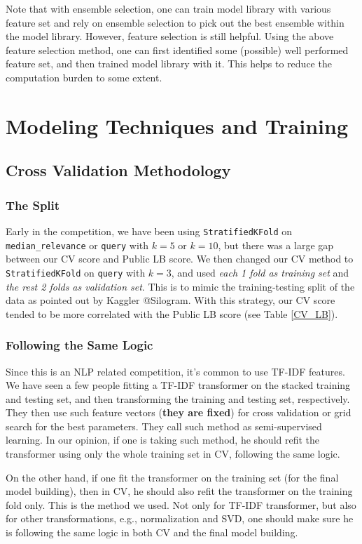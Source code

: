 \documentclass[12pt]{article}
\begin{document}
Note that with ensemble selection, one can train model library with various feature set and rely on ensemble selection to pick out the best ensemble within the model library. However, feature selection is still helpful. Using the above feature selection method, one can first identified some (possible) well performed feature set, and then trained model library with it. This helps to reduce the computation burden to some extent.

\section{Modeling Techniques and Training}
\subsection{Cross Validation Methodology}
\subsubsection{The Split}
Early in the competition, we have been using \texttt{StratifiedKFold} on \texttt{median\_relevance} or \texttt{query} with $k = 5$ or $k = 10$, but there was a large gap between our CV score and Public LB score. We then changed our CV method to \texttt{StratifiedKFold} on \texttt{query} with $k = 3$, and used \emph{each 1 fold as training set} and \emph{the rest 2 folds as validation set}. This is to mimic the training-testing split of the data as pointed out by Kaggler @Silogram. With this strategy, our CV score tended to be more correlated with the Public LB score (see Table \ref{CV_LB}).
\subsubsection{Following the Same Logic}
Since this is an NLP related competition, it's common to use TF-IDF features. We have seen a few people fitting a TF-IDF transformer on the stacked training and testing set, and then transforming the training and testing set, respectively. They then use such feature vectors (\textbf{they are fixed}) for cross validation or grid search for the best parameters. They call such method as semi-supervised learning. In our opinion, if one is taking such method, he should refit the transformer using only the whole training set in CV, following the same logic.

On the other hand, if one fit the transformer on the training set (for the final model building), then in CV, he should also refit the transformer on the training fold only. This is the method we used. Not only for TF-IDF transformer, but also for other transformations, e.g., normalization and SVD, one should make sure he is following the same logic in both CV and the final model building.
\end{document}
